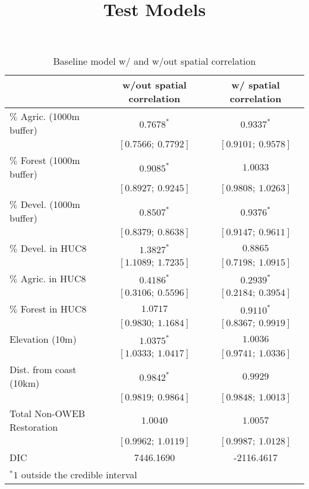 \documentclass[12pt,a4paper,titlepage]{article}
\title{Test Models}
\begin{document}
\begin{table}
\caption{Baseline model w/ and w/out spatial correlation}
\begin{center}
\begin{tabular}{l c c }
\hline
                            & w/out spatial correlation & w/ spatial correlation \\
\hline
$\%$  Agric. (1000m buffer) & $0.7678^{*}$        & $0.9337^{*}$        \\
                            & $[0.7566;\ 0.7792]$ & $[0.9101;\ 0.9578]$ \\
$\%$  Forest (1000m buffer) & $0.9085^{*}$        & $1.0033$            \\
                            & $[0.8927;\ 0.9245]$ & $[0.9808;\ 1.0263]$ \\
$\%$  Devel. (1000m buffer) & $0.8507^{*}$        & $0.9376^{*}$        \\
                            & $[0.8379;\ 0.8638]$ & $[0.9147;\ 0.9611]$ \\
$\%$  Devel. in HUC8        & $1.3827^{*}$        & $0.8865$            \\
                            & $[1.1089;\ 1.7235]$ & $[0.7198;\ 1.0915]$ \\
$\%$  Agric. in HUC8        & $0.4186^{*}$        & $0.2939^{*}$        \\
                            & $[0.3106;\ 0.5596]$ & $[0.2184;\ 0.3954]$ \\
$\%$  Forest in HUC8        & $1.0717$            & $0.9110^{*}$        \\
                            & $[0.9830;\ 1.1684]$ & $[0.8367;\ 0.9919]$ \\
Elevation (10m)             & $1.0375^{*}$        & $1.0036$            \\
                            & $[1.0333;\ 1.0417]$ & $[0.9741;\ 1.0336]$ \\
Dist. from coast (10km)     & $0.9842^{*}$        & $0.9929$            \\
                            & $[0.9819;\ 0.9864]$ & $[0.9848;\ 1.0013]$ \\
Total Non-OWEB Restoration  & $1.0040$            & $1.0057$            \\
                            & $[0.9962;\ 1.0119]$ & $[0.9987;\ 1.0128]$ \\
\hline
DIC                         & 7446.1690           & -2116.4617          \\
\hline
\multicolumn{3}{l}{\scriptsize{$^* 1$ outside the credible interval}}
\end{tabular}
\label{table:basemods}
\end{center}
\end{table}
\end{document}
